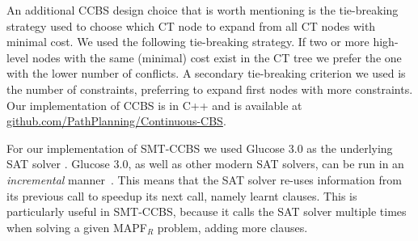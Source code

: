 \documentclass[review]{elsarticle}
\newcommand\konstantin[1]{\nb{\textbf{Konstantin:}}{red}{#1}}
\newcommand\roni[1]{\nb{\textbf{Roni:}}{green}{#1}}
\newcommand{\ccbs}{\ac{CCBS}\xspace}
\newcommand{\cbs}{\ac{CBS}\xspace}
\newcommand{\ct}{\ac{CT}\xspace}
\newcommand{\mapfr}{\ac{MAPF}$_R$\xspace}
\newcommand{\smtccbs}{SMT-CCBS\xspace}
\newcommand{\iscollision}{\textsc{IsCollision}\xspace}
\newcommand{\inconflict}{\textsc{InConflict}\xspace}
\begin{document}



An additional \ccbs design choice that is worth mentioning is the tie-breaking strategy used to choose which \ct node to expand from all \ct nodes with minimal cost. We used the following tie-breaking strategy. If two or more high-level nodes with the same (minimal) cost exist in the CT tree we prefer the one with the lower number of conflicts. A secondary tie-breaking criterion we used is the number of constraints, preferring to expand first nodes with more constraints. %
Our implementation of \ccbs is in C++ and is available at \url{github.com/PathPlanning/Continuous-CBS}.


For our implementation of \smtccbs we used  Glucose 3.0 as the underlying SAT solver \cite{DBLP:journals/ijait/AudemardS18}. Glucose 3.0, as well as other modern SAT solvers, can be run in an \emph{incremental} manner~\cite{DBLP:conf/sat/AudemardLS13}. This means that the SAT solver re-uses information from its previous call to speedup its next call, namely learnt clauses. This is particularly useful in \smtccbs, because it calls the SAT solver multiple times when solving a given \mapfr problem, adding more clauses.
\end{document}
